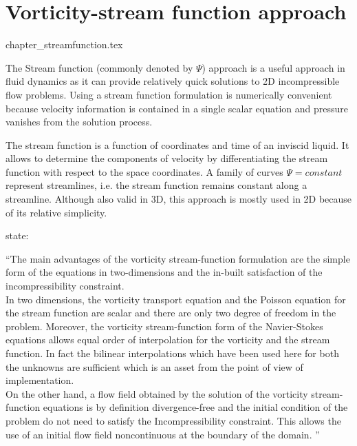 \chapter{Vorticity-stream function approach}

\begin{flushright} {\tiny {\color{gray} chapter\_streamfunction.tex}} \end{flushright}


The Stream function (commonly denoted by $\Psi$) approach is a useful approach in 
fluid dynamics as it can provide relatively quick solutions to 2D incompressible flow problems.
Using a stream function formulation is numerically convenient because velocity information is 
contained in a single scalar equation and pressure vanishes from the solution process.

The stream function is a function of coordinates and time of an inviscid liquid.
It allows to determine the components of velocity by differentiating the stream function 
with respect to the space coordinates. A family of curves $\Psi = constant$ represent 
{\color{olive} streamlines}, i.e. the stream function remains constant along a streamline. 
Although also valid in 3D, this approach is mostly used in 2D because of its 
relative simplicity.

\textcite{glte87} state: 
\begin{displayquote}
{\color{darkgray}
``The main advantages of the vorticity stream-function formulation are the
simple form of the equations in two-dimensions and the in-built satisfaction of the
incompressibility constraint.\\
In two dimensions, the vorticity transport equation and the Poisson equation
for the stream function are scalar and there are only two degree of freedom in
the problem. Moreover, the vorticity stream-function form of the Navier-Stokes
equations allows equal order of interpolation for the vorticity and the stream 
function. In fact the bilinear interpolations which have been used here for both the
unknowns are sufficient which is an asset from the point of view of implementation.\\
On the other hand, a flow field obtained by the solution of the vorticity
stream-function equations is by definition divergence-free and the initial condition
of the problem do not need to satisfy the Incompressibility constraint. This allows
the use of an initial flow field noncontinuous at the boundary of the domain.
''}
\end{displayquote}



